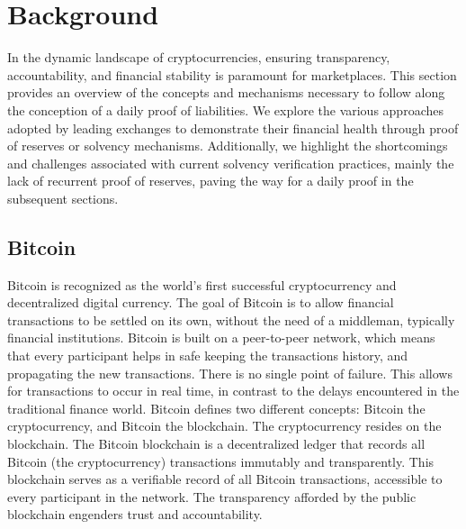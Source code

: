 
\chapter{Background}

In the dynamic landscape of cryptocurrencies, ensuring transparency, accountability, and financial stability
 is paramount for marketplaces. This section provides an overview of the concepts and mechanisms 
 necessary to follow along the conception of a daily proof of liabilities. We explore the various approaches adopted by leading exchanges
  to demonstrate their financial health through proof of reserves or solvency mechanisms. Additionally, we 
  highlight the shortcomings and challenges associated with current solvency verification practices, mainly the lack of recurrent proof of reserves,
   paving the way for a daily proof in the subsequent sections.

\section{Bitcoin}

Bitcoin is recognized as the world's first successful cryptocurrency and decentralized digital currency. 
The goal of Bitcoin is to allow financial transactions to be settled on its own, without the need of a middleman, typically financial institutions.
Bitcoin is built on a peer-to-peer network, which means that every participant helps in safe keeping the transactions history, and propagating the new transactions.
There is no single point of failure. This allows for transactions to occur in real time, in contrast to the delays encountered in the traditional finance world.
Bitcoin defines two different concepts: Bitcoin the cryptocurrency, and Bitcoin the blockchain. The cryptocurrency resides on the blockchain.
The Bitcoin blockchain is a decentralized ledger that records all Bitcoin (the cryptocurrency) transactions immutably and transparently. 
This blockchain serves as a verifiable record of all Bitcoin transactions, accessible to every participant in the network. 
The transparency afforded by the public blockchain engenders trust and accountability.


